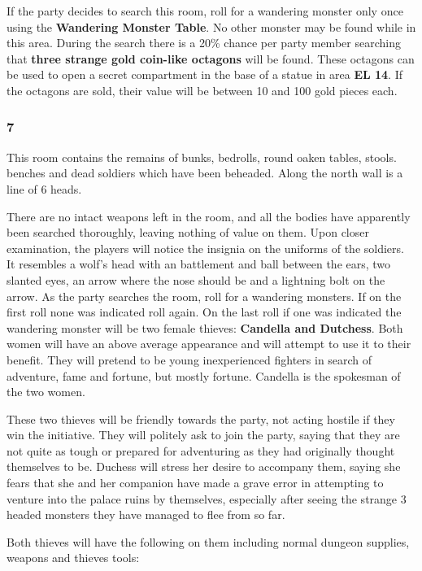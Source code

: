 \documentclass[palace_of_the_silver_princess]{subfiles}
\begin{document}
If the party decides to search this room, roll for a wandering monster
only once using the \textbf{Wandering Monster Table}. No other monster
may be found while in this area. During the search there is a 20\%
chance per party member searching that \textbf{three strange gold
coin-like octagons} will be found. These octagons can be used to open a
secret compartment in the base of a statue in area \textbf{EL 14}. If
the octagons are sold, their value will be between 10 and 100 gold
pieces each.

\subsubsection{7}
\begin{quotebox}
    This room contains the remains of bunks, bedrolls, round oaken
    tables, stools. benches and dead soldiers which have been beheaded.
    Along the north wall is a line of 6 heads.
\end{quotebox}

There are no intact weapons left in the room, and all the bodies have
apparently been searched thoroughly, leaving nothing of value on them.
Upon closer examination, the players will notice the insignia on the
uniforms of the soldiers. It resembles a wolf's head with an battlement
and ball between the ears, two slanted eyes, an arrow where the nose
should be and a lightning bolt on the arrow. As the party searches the
room, roll for a wandering monsters. If on the first roll none was
indicated roll again. On the last roll if one was indicated the
wandering monster will be two female thieves: \textbf{Candella and
Dutchess}.  Both women will have an above average appearance and will
attempt to use it to their benefit. They will pretend to be young
inexperienced fighters in search of adventure, fame and fortune, but
mostly fortune.  Candella is the spokesman of the two women.

These two thieves will be friendly towards the party, not acting hostile
if they win the initiative. They will politely ask to join the party,
saying that they are not quite as tough or prepared for adventuring as
they had originally thought themselves to be. Duchess will stress her
desire to accompany them, saying she fears that she and her companion
have made a grave error in attempting to venture into the palace ruins
by themselves, especially after seeing the strange 3 headed monsters
they have managed to flee from so far.

Both thieves will have the following on them including normal dungeon
supplies, weapons and thieves tools:
\end{document}
